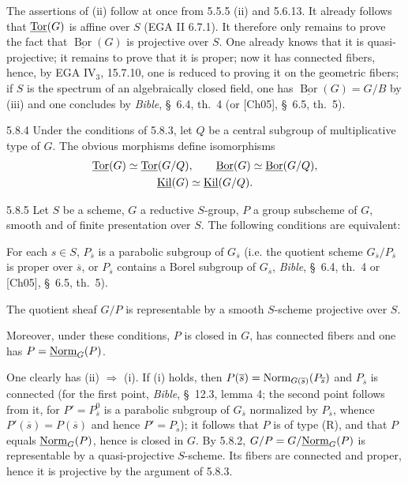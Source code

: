 The assertions of (ii) follow at once from 5.5.5 (ii) and 5.6.13. It already follows that $\underline{\operatorname{Tor}}(G)$ is affine over $S$ (EGA II 6.7.1). It therefore only remains to prove the fact that $\underline{\operatorname{Bor}}(G)$ is projective over $S$. One already knows that it is quasi-projective; it remains to prove that it is proper;{\renewcommand{\thefootnote}{(53)}} now it has connected fibers, hence, by EGA IV$_3$, 15.7.10, one is reduced to proving it on the geometric fibers; if $S$ is the spectrum of an algebraically closed field, one has $\underline{\operatorname{Bor}}(G)=G/B$ by (iii) and one concludes by \textit{Bible}, \S~6.4, th.~4 (or [Ch05], \S~6.5, th.~5).
\begin{remark}{5.8.4}\label{XXII.5.8.4}
Under the conditions of 5.8.3, let $Q$ be a central subgroup of multiplicative type of $G$. The obvious morphisms define isomorphisms
\[
\begin{gathered}
\underline{\operatorname{Tor}}(G)\simeq\underline{\operatorname{Tor}}(G/Q),\qquad
\underline{\operatorname{Bor}}(G)\simeq\underline{\operatorname{Bor}}(G/Q),\\
\underline{\operatorname{Kil}}(G)\simeq\underline{\operatorname{Kil}}(G/Q).
\end{gathered}
\]
\end{remark}
\begin{corollary}{5.8.5}\label{XXII.5.8.5}
Let $S$ be a scheme, $G$ a reductive $S$-group, $P$ a group subscheme of $G$, smooth and of finite presentation over $S$. The following conditions are equivalent:
\begin{enumeratei}
\item For each $s\in S$, $P_{\overline s}$ is a parabolic subgroup of $G_{\overline s}$ (i.e. the quotient scheme $G_{\overline s}/P_{\overline s}$ is proper over $\overline s$, or $P_{\overline s}$ contains a Borel subgroup of $G_{\overline s}$, \cf \textit{Bible}, \S~6.4, th.~4 or [Ch05], \S~6.5, th.~5).
\item The quotient sheaf $G/P$ is representable by a smooth $S$-scheme projective over $S$.
\end{enumeratei}
Moreover, under these conditions, $P$ is closed in $G$, has connected fibers and one has $P=\underline{\mathrm{Norm}}_G(P)$.
\end{corollary}
One clearly has (ii) $\Rightarrow$ (i). If (i) holds, then $P(\overline s)=\operatorname{Norm}_{G(\overline s)}(P_{\overline s})$ and $P_{\overline s}$ is connected (for the first point, \cf \textit{Bible}, \S~12.3, lemma 4;{\renewcommand{\thefootnote}{(54)}} the second point follows from it, for $P'=P_{\overline s}^0$ is a parabolic subgroup of $G_{\overline s}$ normalized by $P_{\overline s}$, whence $P'(\overline s)=P(\overline s)$ and hence $P'=P_{\overline s}$); it follows that $P$ is of type (R), and that $P$ equals $\underline{\mathrm{Norm}}_G(P)$, hence is closed in $G$. By 5.8.2, $G/P=G/\underline{\mathrm{Norm}}_G(P)$ is representable by a quasi-projective $S$-scheme. Its fibers are connected and proper, hence it is projective by the argument of 5.8.3.
